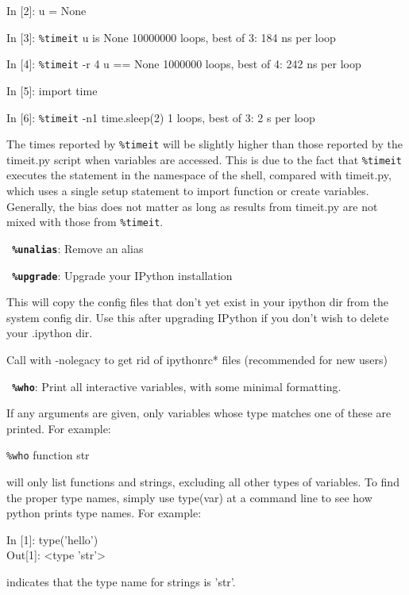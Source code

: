           In [2]: u = None

          In [3]: \texttt{\%timeit} u is None
          10000000 loops, best of 3: 184 ns per loop

          In [4]: \texttt{\%timeit} -r 4 u == None
          1000000 loops, best of 4: 242 ns per loop

          In [5]: import time

          In [6]: \texttt{\%timeit} -n1 time.sleep(2)
          1 loops, best of 3: 2 s per loop
          

        The times reported by \texttt{\%timeit} will be slightly higher than those
        reported by the timeit.py script when variables are accessed. This is
        due to the fact that \texttt{\%timeit} executes the statement in the namespace
        of the shell, compared with timeit.py, which uses a single setup
        statement to import function or create variables. Generally, the bias
        does not matter as long as results from timeit.py are not mixed with
        those from \texttt{\%timeit}.

\bigskip
\texttt{\textbf{ \%unalias}}:
	Remove an alias

\bigskip
\texttt{\textbf{ \%upgrade}}:
	 Upgrade your IPython installation
        
        This will copy the config files that don't yet exist in your 
        ipython dir from the system config dir. Use this after upgrading 
        IPython if you don't wish to delete your .ipython dir.

        Call with -nolegacy to get rid of ipythonrc* files (recommended for
        new users)

        

\bigskip
\texttt{\textbf{ \%who}}:
	Print all interactive variables, with some minimal formatting.

        If any arguments are given, only variables whose type matches one of
        these are printed.  For example:

          \texttt{\%who} function str

        will only list functions and strings, excluding all other types of
        variables.  To find the proper type names, simply use type(var) at a
        command line to see how python prints type names.  For example:

          In [1]: type('hello')\\
          Out[1]: <type 'str'>

        indicates that the type name for strings is 'str'.

